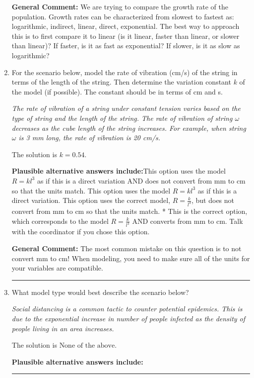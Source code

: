 \documentclass{extbook}[14pt]
\newcommand{\litem}[1]{\item #1

\rule{\textwidth}{0.4pt}}
\begin{document}
\begin{enumerate}
{\textbf{General Comment:} We are trying to compare the growth rate of the population. Growth rates can be characterized from slowest to fastest as: logarithmic, indirect, linear, direct, exponential. The best way to approach this is to first compare it to linear (is it linear, faster than linear, or slower than linear)? If faster, is it as fast as exponential? If slower, is it as slow as logarithmic?
}
\litem{
For the scenario below, model the rate of vibration (cm/s) of the string in terms of the length of the string. Then determine the variation constant $k$ of the model (if possible). The constant should be in terms of cm and s.

\begin{center}
    \textit{ The rate of vibration of a string under constant tension varies based on the type of string and the length of the string. The rate of vibration of string $\omega$ decreases as the cube length of the string increases. For example, when string $\omega$ is 3 mm long, the rate of vibration is 20 cm/s. }
\end{center}
The solution is \( k = 0.54 \).\begin{enumerate}[label=\Alph*.]
\textbf{Plausible alternative answers include:}This option uses the model $R = kl^{3}$ as if this is a direct variation AND does not convert from mm to cm so that the units match.
This option uses the model $R = kl^{3}$ as if this is a direct variation.
This option uses the correct model, $R = \frac{k}{l^{3}}$, but does not convert from mm to cm so that the units match.
* This is the correct option, which corresponds to the model $R = \frac{k}{l^{3}}$ AND converts from mm to cm.
Talk with the coordinator if you chose this option.
\end{enumerate}

\textbf{General Comment:} The most common mistake on this question is to not convert mm to cm! When modeling, you need to make sure all of the units for your variables are compatible.
}
\litem{
What model type would best describe the scenario below?

\begin{center}
    \textit{ Social distancing is a common tactic to counter potential epidemics. This is due to the exponential increase in number of people infected as the density of people living in an area increases. }
\end{center}
The solution is \( \text{None of the above} \).\begin{enumerate}[label=\Alph*.]
\textbf{Plausible alternative answers include:}




\end{enumerate}}
\end{enumerate}
\end{document}
